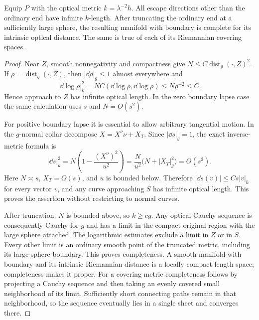 \begin{lemma}
\label{geo-optical-completeness}
Equip $P$ with the optical metric $k=\lambda^{-2}h$.  All escape directions
other than the ordinary end have infinite $k$-length.  After truncating the
ordinary end at a sufficiently large sphere, the resulting manifold with
boundary is complete for its intrinsic optical distance.  The same is true
of each of its Riemannian covering spaces.
\end{lemma}
\begin{proof}
Near $Z$, smooth nonnegativity and compactness give
$N\leq C\operatorname{dist}_g(\cdot,Z)^2$.  If
$\rho=\operatorname{dist}_g(\cdot,Z)$, then $|\dd\rho|_g\leq1$ almost
everywhere and
\[
 |\dd\log\rho|_k^2
   =N C(\dd\log\rho,\dd\log\rho)
   \leq N\rho^{-2}\leq C.
\]
Hence approach to $Z$ has infinite optical length.  In the zero boundary
lapse case the same calculation uses $s$ and $N=O(s^2)$.

For positive boundary lapse it is essential to allow arbitrary tangential
motion.  In the $g$-normal collar decompose
$X=X^\nu\nu+X_T$.  Since $|\dd s|_g=1$, the exact inverse-metric formula
is
\begin{equation}
 |\dd s|_k^2
 =N\left(1-\frac{(X^\nu)^2}{u^2}\right)
 =\frac{N}{u^2}\bigl(N+|X_T|_g^2\bigr)=O(s^2).
 \label{geo-optical-arbitrary-curve}
\end{equation}
Here $N\asymp s$, $X_T=O(s)$, and $u$ is bounded below.  Therefore
$|\dd s(v)|\leq Cs|v|_k$ for every vector $v$, and any curve approaching
$S$ has infinite optical length.  This proves the assertion without
restricting to normal curves.

After truncation, $N$ is bounded above, so $k\geq c g$.  Any optical Cauchy
sequence is consequently Cauchy for $g$ and has a limit in the compact
original region with the large sphere attached.  The logarithmic estimates
exclude a limit in $Z$ or in $S$.  Every other limit is an ordinary smooth
point of the truncated metric, including its large-sphere boundary.  This
proves completeness.  A smooth manifold with boundary and its intrinsic
Riemannian distance is a locally compact length space; completeness makes
it proper.  For a covering metric completeness follows by projecting a
Cauchy sequence and then taking an evenly covered small neighborhood of its
limit.  Sufficiently short connecting paths remain in that neighborhood, so
the sequence eventually lies in a single sheet and converges there.
\end{proof}


